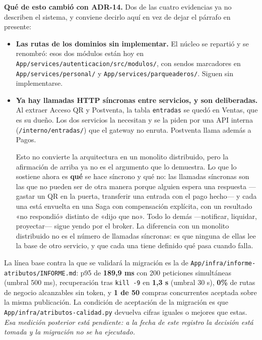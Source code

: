 \documentclass[11pt,a4paper]{article}
\begin{document}
\medskip
\textbf{Qué de esto cambió con ADR-14.} Dos de las cuatro evidencias ya no describen el sistema, y
conviene decirlo aquí en vez de dejar el párrafo en presente:

\begin{itemize}
  \item \textbf{Las rutas de los dominios sin implementar.} El núcleo se repartió y se renombró:
        esos dos módulos están hoy en \texttt{App/services/autenticacion/src/modulos/}, con sendos
        marcadores en \texttt{App/services/personal/} y \texttt{App/services/parqueaderos/}. Siguen
        sin implementarse.
  \item \textbf{Ya hay llamadas HTTP síncronas entre servicios, y son deliberadas.} Al extraer
        Acceso QR y Postventa, la tabla \texttt{entradas} se quedó en Ventas, que es su dueño. Los
        dos servicios la necesitan y se la piden por una API interna
        (\texttt{/interno/entradas/}) que el gateway no enruta. Postventa llama además a Pagos.

        Esto no convierte la arquitectura en un monolito distribuido, pero la afirmación de arriba
        ya no es el argumento que lo demuestra. Lo que lo sostiene ahora es \textbf{qué} se hace
        síncrono y qué no: las llamadas síncronas son las que no pueden ser de otra manera porque
        alguien espera una respuesta ---gastar un QR en la puerta, transferir una entrada con el
        pago hecho--- y cada una está envuelta en una Saga con compensación explícita, con un
        resultado «no respondió» distinto de «dijo que no». Todo lo demás ---notificar, liquidar,
        proyectar--- sigue yendo por el broker. La diferencia con un monolito distribuido no es el
        número de llamadas síncronas: es que ninguna de ellas lee la base de otro servicio, y que
        cada una tiene definido qué pasa cuando falla.
\end{itemize}

La línea base contra la que se validará la migración es la de
\texttt{App/infra/informe-atributos/INFORME.md}: p95 de \textbf{189,9 ms} con 200 peticiones
simultáneas (umbral 500 ms), recuperación tras \texttt{kill -9} en \textbf{1,3 s} (umbral 30 s),
\textbf{0\%} de rutas de negocio alcanzables sin token, y \textbf{1 de 50} compras concurrentes
aceptada sobre la misma publicación. La condición de aceptación de la migración es que
\texttt{App/infra/atributos-calidad.py} devuelva cifras iguales o mejores que estas. \textit{Esa
medición posterior está pendiente: a la fecha de este registro la decisión está tomada y la
migración no se ha ejecutado.}
\end{document}
